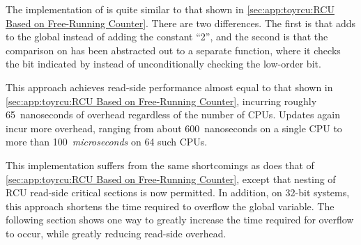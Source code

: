 \begin{fcvref}
The implementation of  is quite similar to
that shown in
\cref{sec:app:toyrcu:RCU Based on Free-Running Counter}.
There are two differences.
The first is that 
adds  to the global 
instead of adding the constant ``2'',
and the second is that the comparison on 
has been abstracted out to a separate function,
where it checks the bit indicated by 
instead of unconditionally checking the low-order bit.
\end{fcvref}

This approach achieves read-side performance almost equal to that
shown in
\cref{sec:app:toyrcu:RCU Based on Free-Running Counter}, incurring
roughly 65~nanoseconds of overhead regardless of the number of
 CPUs.
Updates again incur more overhead, ranging from about 600~nanoseconds on
a single  CPU to more than 100~\emph{microseconds} on 64
such CPUs.

\QuickQuizEnd

This implementation suffers from the same shortcomings as does that of
\cref{sec:app:toyrcu:RCU Based on Free-Running Counter}, except that
nesting of RCU read-side critical sections is now permitted.
In addition, on 32-bit systems, this approach shortens the time
required to overflow the global  variable.
The following section shows one way to greatly increase the time
required for overflow to occur, while greatly reducing read-side
overhead.

